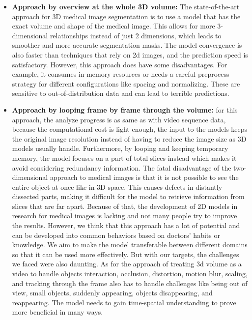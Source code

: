 \begin{itemize}
    \item \textbf{Approach by overview at the whole 3D volume:} The state-of-the-art approach for 3D medical image segmentation is to use a model that has the exact volume and shape of the medical image. This allows for more 3-dimensional relationships instead of just 2 dimensions, which leads to smoother and more accurate segmentation masks. The model convergence is also faster than techniques that rely on 2d images, and the prediction speed is satisfactory. However, this approach does have some disadvantages. For example, it consumes in-memory resources or needs a careful preprocess strategy for different configurations like spacing and normalizing. These are sensitive to out-of-distribution data and can lead to terrible predictions. 
    \item \textbf{Approach by looping frame by frame through the volume:} for this approach, the analyze progress is as same as with video sequence data, because the computational cost is light enough, the input to the models keeps the original image resolution instead of having to reduce the image size as 3D models usually handle. Furthermore, by looping and keeping temporary memory, the model focuses on a part of total slices instead which makes it avoid considering redundancy information. The fatal disadvantage of the two-dimensional approach to medical images is that it is not possible to see the entire object at once like in 3D space. This causes defects in distantly dissected parts, making it difficult for the model to retrieve information from slices that are far apart. Because of that, the development of 2D models in research for medical images is lacking and not many people try to improve the results. However, we think that this approach has a lot of potential and can be developed into common behaviors based on doctors' habits or knowledge. We aim to make the model transferable between different domains so that it can be used more effectively. But with our targets, the challenges we faced were also daunting. As for the approach of treating 3d volume as a video to handle objects interaction, occlusion, distortion, motion blur, scaling, and tracking through the frame also has to handle challenges like being out of view, small objects, suddenly appearing, objects disappearing, and reappearing. The model needs to gain time-spatial understanding to prove more beneficial in many ways.
\end{itemize}


